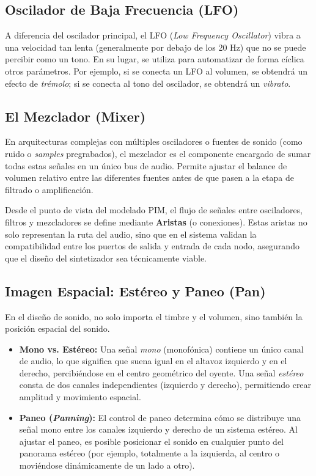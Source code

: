 \subsection{Oscilador de Baja Frecuencia (LFO)}
A diferencia del oscilador principal, el LFO (\textit{Low Frequency Oscillator}) vibra a una velocidad tan lenta (generalmente por debajo de los 20 Hz) que no se puede percibir como un tono. En su lugar, se utiliza para automatizar de forma cíclica otros parámetros. Por ejemplo, si se conecta un LFO al volumen, se obtendrá un efecto de \textit{trémolo}; si se conecta al tono del oscilador, se obtendrá un \textit{vibrato}.

\subsection{El Mezclador (Mixer)}
En arquitecturas complejas con múltiples osciladores o fuentes de sonido (como ruido o \textit{samples} pregrabados), el mezclador es el componente encargado de sumar todas estas señales en un único bus de audio. Permite ajustar el balance de volumen relativo entre las diferentes fuentes antes de que pasen a la etapa de filtrado o amplificación.

Desde el punto de vista del modelado PIM, el flujo de señales entre osciladores, filtros y mezcladores se define mediante \textbf{Aristas} (o conexiones). Estas aristas no solo representan la ruta del audio, sino que en el sistema validan la compatibilidad entre los puertos de salida y entrada de cada nodo, asegurando que el diseño del sintetizador sea técnicamente viable.

\subsection{Imagen Espacial: Estéreo y Paneo (Pan)}
En el diseño de sonido, no solo importa el timbre y el volumen, sino también la posición espacial del sonido. 
\begin{itemize}
    \item \textbf{Mono vs. Estéreo:} Una señal \textit{mono} (monofónica) contiene un único canal de audio, lo que significa que suena igual en el altavoz izquierdo y en el derecho, percibiéndose en el centro geométrico del oyente. Una señal \textit{estéreo} consta de dos canales independientes (izquierdo y derecho), permitiendo crear amplitud y movimiento espacial.
    \item \textbf{Paneo (\textit{Panning}):} El control de paneo determina cómo se distribuye una señal mono entre los canales izquierdo y derecho de un sistema estéreo. Al ajustar el paneo, es posible posicionar el sonido en cualquier punto del panorama estéreo (por ejemplo, totalmente a la izquierda, al centro o moviéndose dinámicamente de un lado a otro).
\end{itemize}

